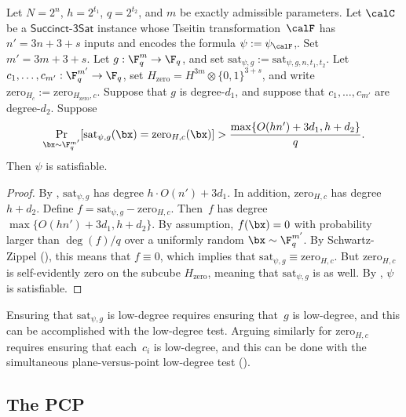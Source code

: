 \documentclass[11pt]{article}
\newcommand{\succinct}{\mathsf{Succinct}\text{-}\mathsf{3Sat}}
\begin{document}
\begin{lemma}\label{lem:the-grand-finale}
Let $N=2^n$, $h = 2^{t_1}$, $q= 2^{t_2}$, and $m$ be exactly admissible parameters.
Let $\calC$ be a $\succinct$ instance whose Tseitin transformation~$\calF$
has $n' = 3n + 3 + s$ inputs and encodes the formula $\psi := \psi_{\calF}$,.
Set $m' = 3m + 3 + s$.
Let $g:\F_q^m \rightarrow \F_q$, and set $\mathrm{sat}_{\psi,g} := \mathrm{sat}_{\psi,g, n, t_1, t_2}$.
Let $c_1, \ldots, c_{m'}: \F_q^{m'} \rightarrow \F_q$, set $H_{\mathrm{zero}} = H^{3m} \otimes \{0, 1\}^{3 + s}$, and write $\mathrm{zero}_{H_c} := \mathrm{zero}_{H_{\mathrm{zero}},  c}$.
Suppose that $g$ is degree-$d_1$, and suppose that $c_1, \ldots, c_{m'}$ are degree-$d_2$.
Suppose
\begin{equation*}
\Pr_{\bx \sim \F_q^{m'}}[\mathrm{sat}_{\psi,g}(\bx) =  \mathrm{zero}_{H,c}(\bx)] > \frac{\max\{O(h n') + 3 d_1, h + d_2\}}{q}.
\end{equation*}
Then $\psi$ is satisfiable.
\end{lemma}
\begin{proof}
By ,
$\mathrm{sat}_{\psi, g}$ has degree $h \cdot O(n') + 3 d_1$.
In addition, $\mathrm{zero}_{H,c}$ has degree $h + d_2$.
Define $f = \mathrm{sat}_{\psi,g} -  \mathrm{zero}_{H,c}$.
Then~$f$ has degree $\max\{O(h n') + 3 d_1, h + d_2\}$.
By assumption, $f(\bx) = 0$ with probability larger than $\deg(f)/q$ over a uniformly random $\bx \sim \F_q^{m'}$.
By Schwartz-Zippel (), this means that $f \equiv 0$, which implies that $\mathrm{sat}_{\psi, g} \equiv \mathrm{zero}_{H,c}$.
But $\mathrm{zero}_{H,c}$ is self-evidently zero on the subcube $H_{\mathrm{zero}}$,
meaning that $\mathrm{sat}_{\psi,g}$ is as well.
By , $\psi$ is satisfiable.
\end{proof}

Ensuring that $\mathrm{sat}_{\psi,g}$ is low-degree requires ensuring that~$g$ is low-degree, and this can be accomplished with the low-degree test.
Arguing similarly for $\mathrm{zero}_{H,c}$ requires ensuring that each~$c_i$ is low-degree, and this can be done with the simultaneous plane-versus-point low-degree test ().

\subsection{The PCP}\label{sec:the-pcp}
\end{document}
